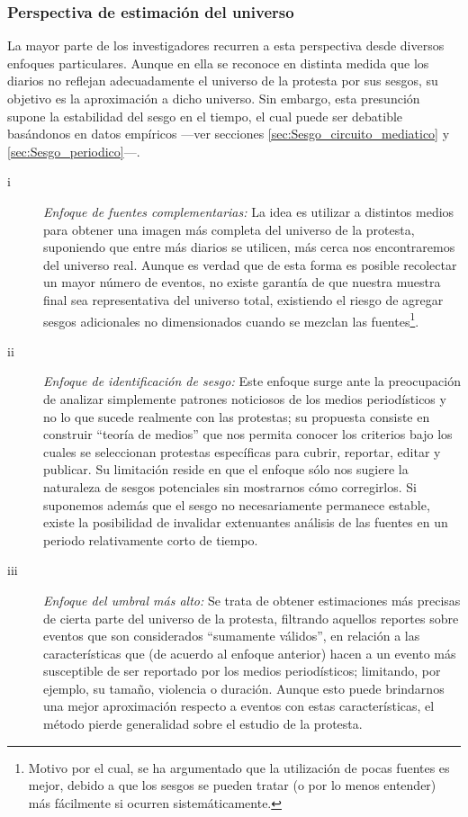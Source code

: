 \documentclass[letterpaper, 11pt]{book}
\theoremstyle{definition}
\theoremstyle{remark}
\begin{document}
\subsubsection{Perspectiva de estimación del universo}
\label{sec:estimacion_universo}

La mayor parte de los investigadores recurren a esta perspectiva desde diversos enfoques particulares. 
Aunque en ella se reconoce en distinta medida que los diarios no reflejan adecuadamente el universo de la protesta por sus sesgos, su objetivo es la aproximación a dicho universo. 
Sin embargo, esta presunción supone la estabilidad del sesgo en el tiempo, el cual puede ser debatible basándonos en datos empíricos ---ver secciones \ref{sec:Sesgo_circuito_mediatico} y \ref{sec:Sesgo_periodico}---.


\begin{description}
    \item[i] \emph{Enfoque de fuentes complementarias:}  La idea es utilizar a distintos medios para obtener una imagen más completa del universo de la protesta, suponiendo que entre más diarios se utilicen, más cerca nos encontraremos del universo real. 
    Aunque es verdad que de esta forma es posible recolectar un mayor número de eventos, no existe garantía de que nuestra muestra final sea representativa del universo total, existiendo el riesgo de agregar sesgos adicionales no dimensionados cuando se mezclan las fuentes\footnote{Motivo por el cual, se ha argumentado que la utilización de pocas fuentes es mejor, debido a que los sesgos se pueden tratar (o por lo menos entender) más fácilmente si ocurren sistemáticamente.}.
    
    \item[ii] \emph{Enfoque de identificación de sesgo:}  Este enfoque surge ante la preocupación de analizar simplemente patrones noticiosos de los medios periodísticos y no lo que sucede realmente con las protestas; su propuesta consiste en construir ``teoría de medios'' que nos permita conocer los criterios bajo los cuales se seleccionan protestas específicas para cubrir, reportar, editar y publicar. 
    Su limitación reside en que el enfoque sólo nos sugiere la naturaleza de sesgos potenciales sin mostrarnos cómo corregirlos. 
    Si suponemos además que el sesgo no necesariamente permanece estable, existe la posibilidad de invalidar extenuantes análisis de las fuentes en un periodo relativamente corto de tiempo.
    
    \item[iii] \emph{Enfoque del umbral más alto:}  Se trata de obtener estimaciones más precisas de cierta parte del universo de la protesta, filtrando aquellos reportes sobre eventos que son considerados ``sumamente válidos'', en relación a las características que (de acuerdo al enfoque anterior) hacen a un evento más susceptible de ser reportado por los medios periodísticos; limitando, por ejemplo, su tamaño, violencia o duración. 
    Aunque esto puede brindarnos una mejor aproximación respecto a eventos con estas características, el método pierde generalidad sobre el estudio de la protesta.
    

\end{description}
\end{document}
